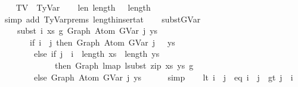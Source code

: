 \begin{isabellebody}
\ \ \isamarkupfalse%
\ TV\ {\isacharequal}{\kern0pt}\ TyVar\isanewline
\isanewline
\ \ \isamarkupfalse%
\ len{\isacharunderscore}{\kern0pt}{\isasymGamma}{}{\isacharcolon}{\kern0pt}\ {\isachardoublequoteopen}length\ {\isasymGamma}\ {\isacharequal}{\kern0pt}\ length\ {\isasymGamma}{}\ {\isacharplus}{\kern0pt}\ {}{\isachardoublequoteclose}\isanewline
\ \ \ \ \ \isamarkupfalse%
\ {\isacharparenleft}{\kern0pt}simp\ add{\isacharcolon}{\kern0pt}\ TyVar{\isachardot}{\kern0pt}prems{\isacharparenleft}{\kern0pt}{}{\isacharparenright}{\kern0pt}\ length{\isacharunderscore}{\kern0pt}insert{\isacharunderscore}{\kern0pt}at{\isacharparenright}{\kern0pt}\isanewline
\isanewline
\ \ \isamarkupfalse%
\ subst{\isacharunderscore}{\kern0pt}GVar{\isacharcolon}{\kern0pt}\isanewline
\ \ \ \ {\isachardoublequoteopen}subst\ i\ xs\ g{}\ {\isacharparenleft}{\kern0pt}Graph\ {\isacharparenleft}{\kern0pt}Atom\ {\isacharparenleft}{\kern0pt}GVar\ j{\isacharparenright}{\kern0pt}\ ys{\isacharparenright}{\kern0pt}{\isacharparenright}{\kern0pt}\ {\isacharequal}{\kern0pt}\isanewline
\ \ \ \ \ \ \ {\isacharparenleft}{\kern0pt}if\ i\ {\isacharless}{\kern0pt}\ j\ then\ Graph\ {\isacharparenleft}{\kern0pt}Atom\ {\isacharparenleft}{\kern0pt}GVar\ {\isacharparenleft}{\kern0pt}j\ {\isacharminus}{\kern0pt}\ {}{\isacharparenright}{\kern0pt}{\isacharparenright}{\kern0pt}\ ys{\isacharparenright}{\kern0pt}\isanewline
\ \ \ \ \ \ \ \ else\ if\ j\ {\isacharequal}{\kern0pt}\ i\ {\isasymand}\ length\ xs\ {\isacharequal}{\kern0pt}\ length\ ys\isanewline
\ \ \ \ \ \ \ \ \ \ \ \ \ then\ Graph\ {\isacharparenleft}{\kern0pt}lmap\ {\isacharparenleft}{\kern0pt}lsubst\ {\isacharparenleft}{\kern0pt}zip\ xs\ ys{\isacharparenright}{\kern0pt}{\isacharparenright}{\kern0pt}\ g{}{\isacharparenright}{\kern0pt}\isanewline
\ \ \ \ \ \ \ \ else\ Graph\ {\isacharparenleft}{\kern0pt}Atom\ {\isacharparenleft}{\kern0pt}GVar\ j{\isacharparenright}{\kern0pt}\ ys{\isacharparenright}{\kern0pt}{\isacharparenright}{\kern0pt}{\isachardoublequoteclose}\isanewline
\isanewline
\ \ \ \ \isamarkupfalse%
\ simp\isanewline
\isanewline
\ \ \isamarkupfalse%
\ {\isacharparenleft}{\kern0pt}lt{\isacharparenright}{\kern0pt}\ {\isachardoublequoteopen}i\ {\isacharless}{\kern0pt}\ j{\isachardoublequoteclose}\ {\isacharbar}{\kern0pt}\ {\isacharparenleft}{\kern0pt}eq{\isacharparenright}{\kern0pt}\ {\isachardoublequoteopen}i\ {\isacharequal}{\kern0pt}\ j{\isachardoublequoteclose}\ {\isacharbar}{\kern0pt}\ {\isacharparenleft}{\kern0pt}gt{\isacharparenright}{\kern0pt}\ {\isachardoublequoteopen}j\ {\isacharless}{\kern0pt}\ i{\isachardoublequoteclose}\isanewline

\end{isabellebody}
